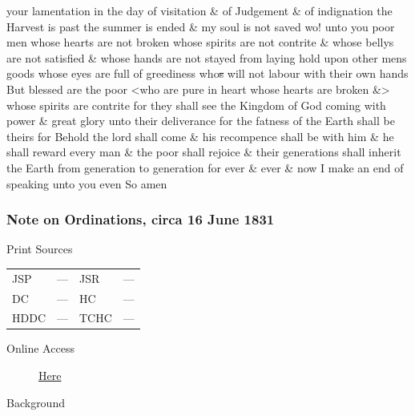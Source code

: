 your lamentation in the day of visitation \& of Judgement \& of indignation the Harvest is past the summer is ended \& my soul is not saved wo! unto you poor men whose hearts are not broken whose spirits are not contrite \& whose bellys are not satisfied \& whose hands are not stayed from laying hold upon other mens goods whose eyes are full of greediness who\sout{s} will not labour with their own hands But blessed are the poor <who are pure in heart whose hearts are broken \&> whose spirits are contrite for they shall see the Kingdom of God coming with power \& great glory unto their deliverance for the fatness of the Earth shall be theirs for Behold the lord shall come \& his recompence shall be with him \& he shall reward every man \& the poor shall rejoice \& their generations shall inherit the Earth from generation to generation for ever \& ever \& now I make an end of speaking unto you even So amen
				
		\subsubsection{Note on Ordinations, circa 16 June 1831}
			\label{EMS-1831-JS-CIR-16-JUN-1831}
		
			\begin{description}
				\item[Print Sources]
			\end{description}

				\begin{tabular}{p{0.5in}p{1in}p{0.5in}p{1in}}
				JSP	 	& ---		& JSR 		& --- \\
				DC	 	& --- 		& HC 		& --- \\
				HDDC 	& ---		& TCHC 		& --- \\
				\end{tabular}
			
			\begin{description}
				\item[Online Access] \href{https://www.josephsmithpapers.org/paper-summary/note-on-ordinations-circa-16-june-1831/1}{Here}
			\end{description}
			
			\begin{description}
				\item[Background]
			\end{description}
			
